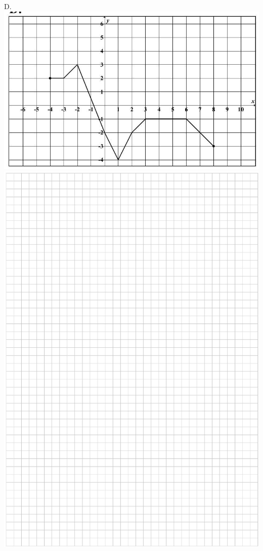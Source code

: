 \documentclass[10pt]{article}
\begin{document}
D.\\
\includegraphics[max width=\textwidth, center]{2024_11_21_603d5c1b2a7d8d68f45fg-04(1)}\\
\includegraphics[max width=\textwidth, center]{2024_11_21_603d5c1b2a7d8d68f45fg-05}
\end{document}

